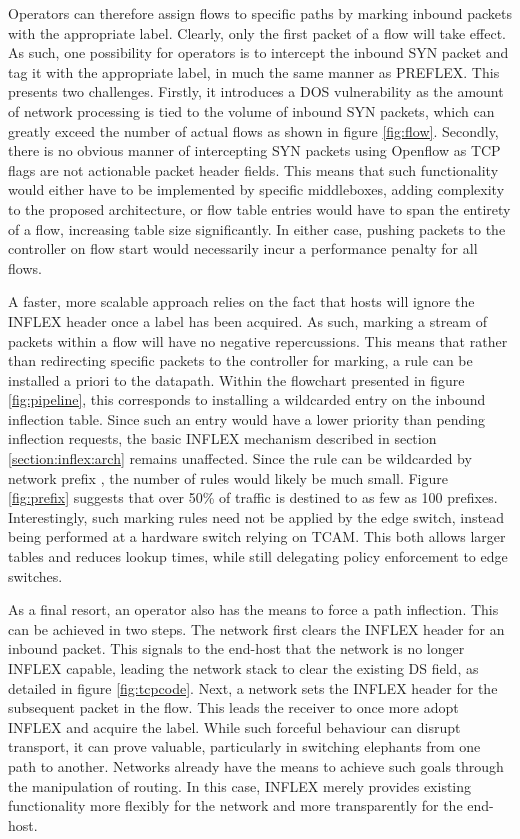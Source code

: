 Operators can therefore assign flows to specific paths by marking inbound packets with the appropriate label.
Clearly, only the first packet of a flow will take effect.
As such, one possibility for operators is to intercept the inbound SYN packet and tag it with the appropriate label, in much the same manner as \ac{PREFLEX}.
This presents two challenges.
Firstly, it introduces a \ac{DOS} vulnerability as the amount of network processing is tied to the volume of inbound SYN packets, which can greatly exceed the number of actual flows as shown in figure \ref{fig:flow}.
Secondly, there is no obvious manner of intercepting SYN packets using Openflow as \ac{TCP} flags are not actionable packet header fields.
This means that such functionality would either have to be implemented by specific middleboxes, adding complexity to the proposed architecture, or flow table entries would have to span the entirety of a flow, increasing table size significantly.
In either case, pushing packets to the controller on flow start would necessarily incur a performance penalty for all flows.

A faster, more scalable approach relies on the fact that hosts will ignore the INFLEX header once a label has been acquired.
As such, marking a stream of packets within a flow will have no negative repercussions.
This means that rather than redirecting specific packets to the controller for marking, a rule can be installed a priori to the datapath.
Within the flowchart presented in figure \ref{fig:pipeline}, this corresponds to installing a wildcarded entry on the inbound inflection table.
Since such an entry would have a lower priority than pending inflection requests, the basic INFLEX mechanism described in section \ref{section:inflex:arch} remains unaffected.
Since the rule can be wildcarded by network prefix , the number of rules would likely be much small. Figure \ref{fig:prefix} suggests that over 50\% of traffic is destined to as few as 100 prefixes.
Interestingly, such marking rules need not be applied by the edge switch, instead being performed at a hardware switch relying on \ac{TCAM}.
This both allows larger tables and reduces lookup times, while still delegating policy enforcement to edge switches.

As a final resort, an operator also has the means to force a path inflection.
This can be achieved in two steps.
The network first clears the INFLEX header for an inbound packet. 
This signals to the end-host that the network is no longer INFLEX capable, leading the network stack to clear the existing \ac{DS} field, as detailed in figure \ref{fig:tcpcode}.
Next, a network sets the INFLEX header for the subsequent packet in the flow.
This leads the receiver to once more adopt INFLEX and acquire the label.
While such forceful behaviour can disrupt transport, it can prove valuable, particularly in switching elephants from one path to another.
Networks already have the means to achieve such goals through the manipulation of routing.
In this case, INFLEX merely provides existing functionality more flexibly for the network and more transparently for the end-host.

